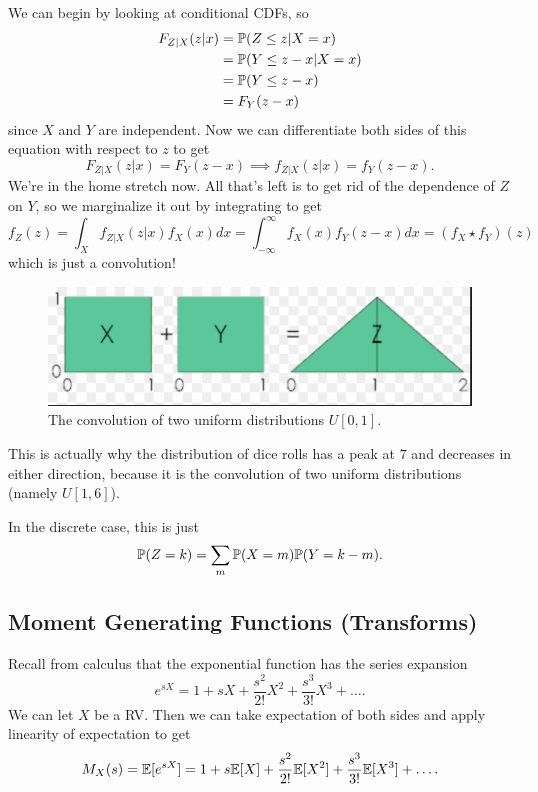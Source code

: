 \documentclass[11 pt]{scrartcl}
\begin{document}
We can begin by looking at conditional CDFs, so 
    \begin{align*}
        F_{Z|X}(z|x) &= \mathbb P(Z \leq z | X = x) \\ 
                     &= \mathbb P(Y \leq z-x | X = x) \\ 
                     &= \mathbb P(Y \leq z-x)  \\ 
                     &= F_Y(z-x)
    \end{align*}
since $X$ and $Y$ are independent. Now we can differentiate both sides of this equation with respect to $z$ to get 
\[ F_{Z|X}(z|x) = F_Y(z-x) \implies f_{Z|X}(z|x)  = f_Y(z-x).\] 
We're in the home stretch now. All that's left is to get rid of the dependence of $Z$ on $Y$, so we marginalize it out by integrating to get 
\[ f_Z(z) = \int_X f_{Z|X}(z|x) f_X(x) dx = \int_{-\infty}^\infty f_X(x)f_Y(z-x)dx =  (f_X\star f_Y)(z)\] 
which is just a convolution! 

\begin{figure}[!ht]
    \centering
\includegraphics[scale = 0.8]{conv_u2.png}
\caption{The convolution of two uniform distributions $U[0,1]$.}
\end{figure}

This is actually why the distribution of dice rolls has a peak at $7$ and decreases in either direction, because it is the convolution of two uniform distributions (namely $U[1,6]$). 

In the discrete case, this is just 
\[ \mathbb P(Z=k) = \sum_m \mathbb P(X=m)\mathbb P(Y=k-m).\] 

\subsection{Moment Generating Functions (Transforms)}
Recall from calculus that the exponential function has the series expansion 
\[ e^{sX} = 1 + sX + \dfrac{s^2}{2!}X^2 + \dfrac{s^3}{3!}X^3 + \dots.\] 
We can let $X$ be a RV. Then we can take expectation of both sides and apply linearity of expectation to get 
\[ M_X(s) = \mathbb E[e^{sX}] = 1 + s\mathbb E[X] + \dfrac{s^2}{2!}\mathbb E[X^2] + \dfrac{s^3}{3!}\mathbb E[X^3] + \dots .\] 
\end{document}
